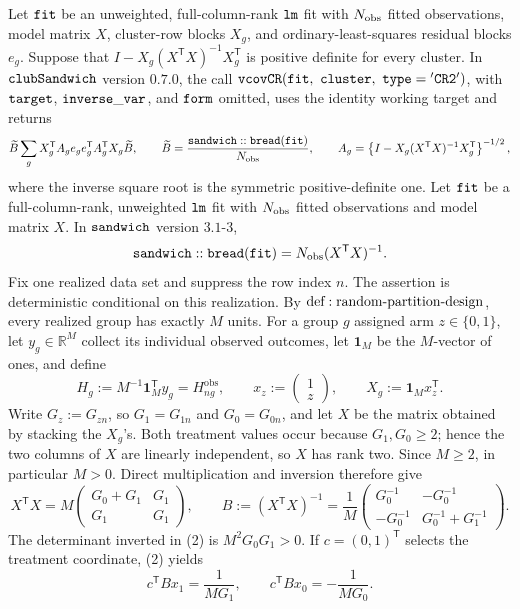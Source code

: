 Let \({\tt fit}\) be an unweighted, full-column-rank \({\tt lm}\) fit with \(N_{\rm obs}\) fitted observations, model matrix \(X\), cluster-row blocks \(X_g\), and ordinary-least-squares residual blocks \(e_g\).  Suppose that \(I-X_g(X^{\mathsf T}X)^{-1}X_g^{\mathsf T}\) is positive definite for every cluster.  In \({\tt clubSandwich}\) version \(0.7.0\), the call \({\tt vcovCR}({\tt fit},\ {\tt cluster},\ {\tt type}={\tt 'CR2'})\), with \({\tt target}\), \({\tt inverse\_var}\), and \({\tt form}\) omitted, uses the identity working target and returns
\[
 \widetilde B
 \sum_gX_g^{\mathsf T}A_ge_ge_g^{\mathsf T}A_g^{\mathsf T}X_g
 \widetilde B,
 \qquad
 \widetilde B=\frac{{\tt sandwich::bread}({\tt fit})}{N_{\rm obs}},
 \qquad
 A_g=\left\{I-X_g(X^{\mathsf T}X)^{-1}X_g^{\mathsf T}\right\}^{-1/2},
\]
where the inverse square root is the symmetric positive-definite one.
Let \({\tt fit}\) be a full-column-rank, unweighted \({\tt lm}\) fit with \(N_{\rm obs}\) fitted observations and model matrix \(X\).  In \({\tt sandwich}\) version \(3.1\text{-}3\),
\[
 {\tt sandwich::bread}({\tt fit})=N_{\rm obs}(X^{\mathsf T}X)^{-1}.
\]
Fix one realized data set and suppress the row index \(n\).  The assertion is deterministic conditional on this realization.  By \({\rm def:random\text{-}partition\text{-}design}\), every realized group has exactly \(M\) units.  For a group \(g\) assigned arm \(z\in\{0,1\}\), let \(y_g\in\mathbb R^M\) collect its individual observed outcomes, let \(\mathbf 1_M\) be the \(M\)-vector of ones, and define
\[
 H_g:=M^{-1}\mathbf 1_M^{\mathsf T}y_g=H^{\mathrm{obs}}_{ng},
 \qquad
 x_z:=\begin{pmatrix}1\\ z\end{pmatrix},
 \qquad
 X_g:=\mathbf 1_Mx_z^{\mathsf T}.
 \tag{1}
\]
Write \(G_z:=G_{zn}\), so \(G_1=G_{1n}\) and \(G_0=G_{0n}\), and let \(X\) be the matrix obtained by stacking the \(X_g\)'s.  Both treatment values occur because \(G_1,G_0\ge2\); hence the two columns of \(X\) are linearly independent, so \(X\) has rank two.  Since \(M\ge2\), in particular \(M>0\).  Direct multiplication and inversion therefore give
\[
 X^{\mathsf T}X
 =M\begin{pmatrix}G_0+G_1&G_1\\G_1&G_1\end{pmatrix},
 \qquad
 B:=(X^{\mathsf T}X)^{-1}
 =\frac1M\begin{pmatrix}
 G_0^{-1}&-G_0^{-1}\\
 -G_0^{-1}&G_0^{-1}+G_1^{-1}
 \end{pmatrix}.
 \tag{2}
\]
The determinant inverted in (2) is \(M^2G_0G_1>0\).  If \(c=(0,1)^{\mathsf T}\) selects the treatment coordinate, (2) yields
\[
 c^{\mathsf T}Bx_1=\frac1{MG_1},
 \qquad
 c^{\mathsf T}Bx_0=-\frac1{MG_0}.
 \tag{3}
\]

